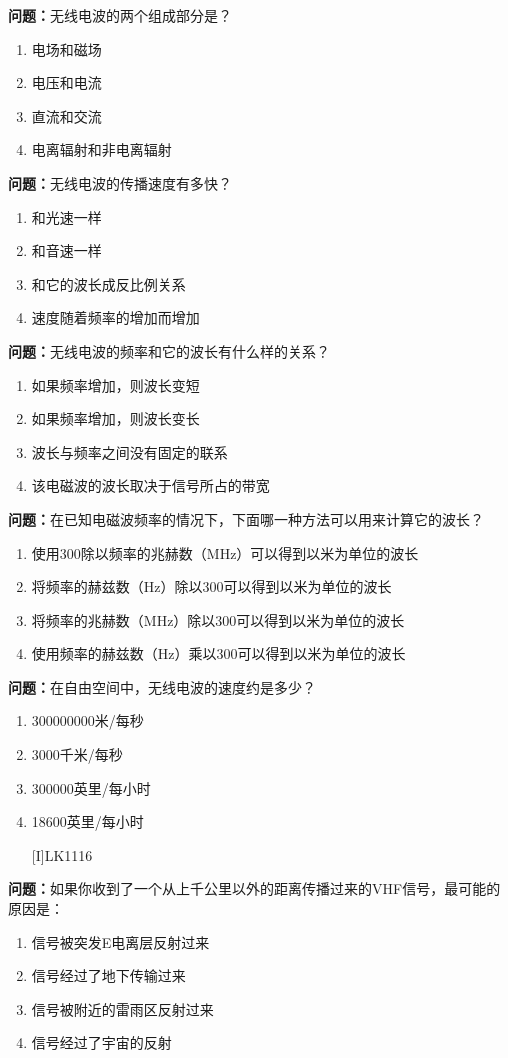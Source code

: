 \documentclass{ctexbook}
\begin{document}
\textbf{问题：}无线电波的两个组成部分是？
\begin{enumerate}[label=\Alph*), leftmargin=3em]
\item 电场和磁场
\item 电压和电流
\item 直流和交流
\item 电离辐射和非电离辐射
\end{enumerate}

\textbf{问题：}无线电波的传播速度有多快？
\begin{enumerate}[label=\Alph*), leftmargin=3em]
\item 和光速一样
\item 和音速一样
\item 和它的波长成反比例关系
\item 速度随着频率的增加而增加
\end{enumerate}

\textbf{问题：}无线电波的频率和它的波长有什么样的关系？
\begin{enumerate}[label=\Alph*), leftmargin=3em]
\item 如果频率增加，则波长变短
\item 如果频率增加，则波长变长
\item 波长与频率之间没有固定的联系
\item 该电磁波的波长取决于信号所占的带宽
\end{enumerate}

\textbf{问题：}在已知电磁波频率的情况下，下面哪一种方法可以用来计算它的波长？
\begin{enumerate}[label=\Alph*), leftmargin=3em]
\item 使用300除以频率的兆赫数（MHz）可以得到以米为单位的波长
\item 将频率的赫兹数（Hz）除以300可以得到以米为单位的波长
\item 将频率的兆赫数（MHz）除以300可以得到以米为单位的波长
\item 使用频率的赫兹数（Hz）乘以300可以得到以米为单位的波长
\end{enumerate}

\textbf{问题：}在自由空间中，无线电波的速度约是多少？
\begin{enumerate}[label=\Alph*), leftmargin=3em]
\item 300000000米/每秒
\item 3000千米/每秒
\item 300000英里/每小时
\item 18600英里/每小时

[I]LK1116

\end{enumerate}
\textbf{问题：}如果你收到了一个从上千公里以外的距离传播过来的VHF信号，最可能的原因是：
\begin{enumerate}[label=\Alph*), leftmargin=3em]
\item 信号被突发E电离层反射过来
\item 信号经过了地下传输过来
\item 信号被附近的雷雨区反射过来
\item 信号经过了宇宙的反射
\end{enumerate}
\end{document}
